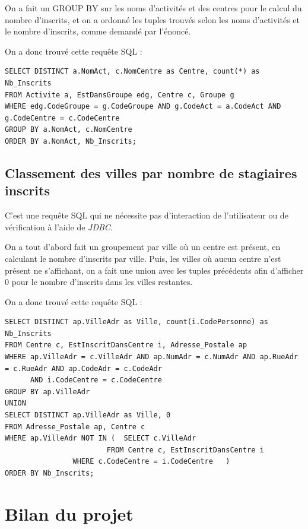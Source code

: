 \documentclass[10pt]{article}
\begin{document}
On a fait un GROUP BY sur les noms d'activités et des centres pour le calcul du nombre d'inscrits, et on a ordonné les tuples trouvés 
selon les noms d'activités et le nombre d'inscrits, comme demandé par l'énoncé.

On a donc trouvé cette requête SQL :

\begin{small}
\begin{verbatim}
SELECT DISTINCT a.NomAct, c.NomCentre as Centre, count(*) as Nb_Inscrits
FROM Activite a, EstDansGroupe edg, Centre c, Groupe g
WHERE edg.CodeGroupe = g.CodeGroupe AND g.CodeAct = a.CodeAct AND g.CodeCentre = c.CodeCentre
GROUP BY a.NomAct, c.NomCentre
ORDER BY a.NomAct, Nb_Inscrits;
\end{verbatim}
\end{small}

\subsection{Classement des villes par nombre de stagiaires inscrits}

C'est une requête SQL qui ne nécessite pas d'interaction de l'utilisateur ou de vérification à l'aide de \emph{JDBC}. 

On a tout d'abord fait un groupement par ville où un centre est présent, en calculant le nombre d'inscrits par ville.
Puis, les villes où aucun centre n'est présent ne s'affichant, on a fait une union avec les tuples précédents afin d'afficher $0$ 
pour le nombre d'inscrits dans les villes restantes.

On a donc trouvé cette requête SQL :

\begin{small}
\begin{verbatim}
SELECT DISTINCT ap.VilleAdr as Ville, count(i.CodePersonne) as Nb_Inscrits
FROM Centre c, EstInscritDansCentre i, Adresse_Postale ap
WHERE ap.VilleAdr = c.VilleAdr AND ap.NumAdr = c.NumAdr AND ap.RueAdr = c.RueAdr AND ap.CodeAdr = c.CodeAdr 
      AND i.CodeCentre = c.CodeCentre
GROUP BY ap.VilleAdr
UNION
SELECT DISTINCT ap.VilleAdr as Ville, 0
FROM Adresse_Postale ap, Centre c
WHERE ap.VilleAdr NOT IN (	SELECT c.VilleAdr
      		      	 	FROM Centre c, EstInscritDansCentre i
				WHERE c.CodeCentre = i.CodeCentre	)
ORDER BY Nb_Inscrits;
\end{verbatim}
\end{small}

\section{Bilan du projet}
\end{document}
